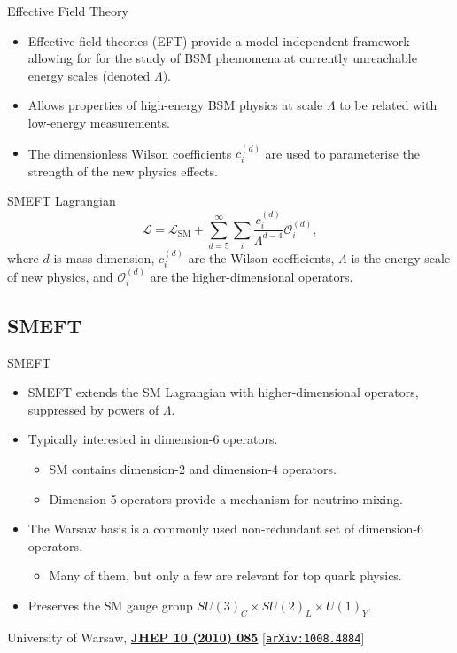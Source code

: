 \documentclass{beamer}
\begin{document}
\begin{frame}{Effective Field Theory}
  \begin{itemize}
    \item Effective field theories (EFT) provide a model-independent framework allowing for for the study of BSM phemomena at currently unreachable energy scales (denoted $\Lambda$).
    \item Allows properties of high-energy BSM physics at scale $\Lambda$ to be related with low-energy measurements.
    \item The dimensionless Wilson coefficients $c_i^{(d)}$ are used to parameterise the strength of the new physics effects.
  \end{itemize}  
  \begin{block}{SMEFT Lagrangian}
    \begin{equation}
      \mathcal{L} = \mathcal{L}_\text{SM} + \sum_{d=5}^{\infty} \sum_i \frac{c_i^{(d)}}{\Lambda^{d-4}} \mathcal{O}_i^{(d)},
    \end{equation}
    where $d$ is mass dimension, $c_i^{(d)}$ are the Wilson coefficients, $\Lambda$ is the energy scale of new physics, and $\mathcal{O}_i^{(d)}$ are the higher-dimensional operators.
  \end{block}
\end{frame}

\subsection{SMEFT}

\begin{frame}{SMEFT}
  \begin{itemize}
    \item SMEFT extends the SM Lagrangian with higher-dimensional operators, suppressed by powers of $\Lambda$.
    \item Typically interested in dimension-6 operators.
    \begin{itemize}
      \item SM contains dimension-2 and dimension-4 operators.
      \item Dimension-5 operators provide a mechanism for neutrino mixing.
    \end{itemize}
    \item The Warsaw basis is a commonly used non-redundant set of dimension-6 operators.
    \begin{itemize}
      \item Many of them, but only a few are relevant for top quark physics.
    \end{itemize}
    \item Preserves the SM gauge group $SU(3)_C \times SU(2)_L \times U(1)_Y$.
  \end{itemize}
  {\tiny \color{gray} University of Warsaw, \textbf{\href{https://doi.org/10.1007/JHEP10(2010)085}{JHEP 10 (2010) 085}} [\href{https://arxiv.org/abs/1008.4884v3}{\texttt{arXiv:1008.4884}}]}
\end{frame}
\end{document}

